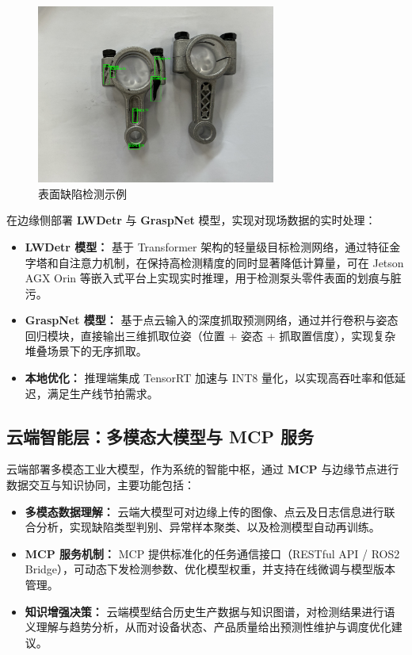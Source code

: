 \documentclass{cumcmthesis}
\begin{document}
\begin{figure}\centering
\includegraphics[width=0.7\textwidth]{result.png}
\caption{表面缺陷检测示例}\label{fig:defect_examples}
\end{figure}
在边缘侧部署 \textbf{LWDetr} 与 \textbf{GraspNet} 模型，实现对现场数据的实时处理：

\begin{itemize}
    \item \textbf{LWDetr 模型：}  
    基于 Transformer 架构的轻量级目标检测网络，通过特征金字塔和自注意力机制，在保持高检测精度的同时显著降低计算量，可在 Jetson AGX Orin 等嵌入式平台上实现实时推理，用于检测泵头零件表面的划痕与脏污。

    \item \textbf{GraspNet 模型：}  
    基于点云输入的深度抓取预测网络，通过并行卷积与姿态回归模块，直接输出三维抓取位姿（位置 + 姿态 + 抓取置信度），实现复杂堆叠场景下的无序抓取。

    \item \textbf{本地优化：}  
    推理端集成 TensorRT 加速与 INT8 量化，以实现高吞吐率和低延迟，满足生产线节拍需求。
\end{itemize}

\subsection{云端智能层：多模态大模型与 MCP 服务}

云端部署多模态工业大模型，作为系统的智能中枢，通过 \textbf{MCP} 与边缘节点进行数据交互与知识协同，主要功能包括：

\begin{itemize}
    \item \textbf{多模态数据理解：}  
    云端大模型可对边缘上传的图像、点云及日志信息进行联合分析，实现缺陷类型判别、异常样本聚类、以及检测模型自动再训练。

    \item \textbf{MCP 服务机制：}  
    MCP 提供标准化的任务通信接口（RESTful API / ROS2 Bridge），可动态下发检测参数、优化模型权重，并支持在线微调与模型版本管理。

    \item \textbf{知识增强决策：}  
    云端模型结合历史生产数据与知识图谱，对检测结果进行语义理解与趋势分析，从而对设备状态、产品质量给出预测性维护与调度优化建议。
\end{itemize}
\end{document}
